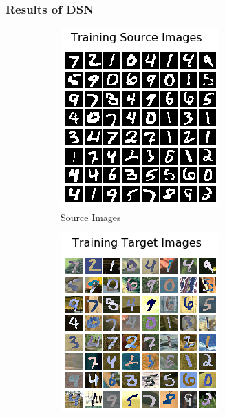 \documentclass{beamer}
\begin{document}
\begin{frame}
    \frametitle{Results of DSN}

    \begin{figure}
        \centering
        \begin{subfigure}[b]{0.3\linewidth}
            \includegraphics[width=\linewidth]{source.png}
            \caption{Source Images}
        \end{subfigure}
        \hfill
        \begin{subfigure}[b]{0.3\linewidth}
            \includegraphics[width=\linewidth]{target.png}

\end{subfigure}
\end{figure}
\end{frame}
\end{document}
